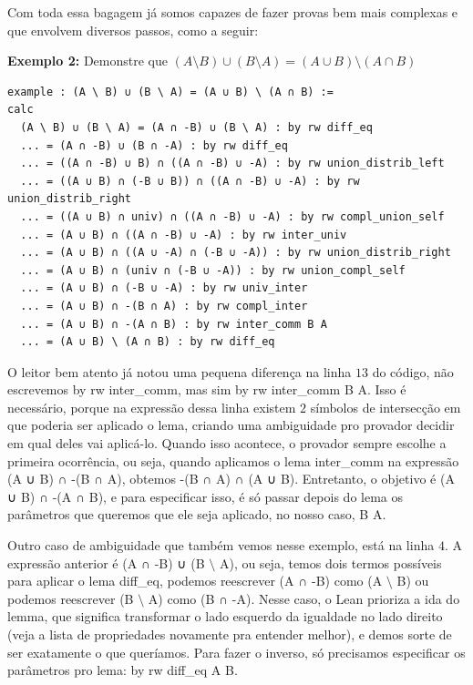 Com toda essa bagagem já somos capazes de fazer provas bem mais complexas e que envolvem diversos passos, como a seguir:

\textbf{Exemplo 2:} Demonstre que $(A \setminus B) \cup (B \setminus A) = (A \cup B) \setminus (A \cap B)$
\begin{lstlisting}
example : (A \ B) ∪ (B \ A) = (A ∪ B) \ (A ∩ B) :=
calc
  (A \ B) ∪ (B \ A) = (A ∩ -B) ∪ (B \ A) : by rw diff_eq
  ... = (A ∩ -B) ∪ (B ∩ -A) : by rw diff_eq
  ... = ((A ∩ -B) ∪ B) ∩ ((A ∩ -B) ∪ -A) : by rw union_distrib_left
  ... = ((A ∪ B) ∩ (-B ∪ B)) ∩ ((A ∩ -B) ∪ -A) : by rw union_distrib_right
  ... = ((A ∪ B) ∩ univ) ∩ ((A ∩ -B) ∪ -A) : by rw compl_union_self
  ... = (A ∪ B) ∩ ((A ∩ -B) ∪ -A) : by rw inter_univ
  ... = (A ∪ B) ∩ ((A ∪ -A) ∩ (-B ∪ -A)) : by rw union_distrib_right
  ... = (A ∪ B) ∩ (univ ∩ (-B ∪ -A)) : by rw union_compl_self
  ... = (A ∪ B) ∩ (-B ∪ -A) : by rw univ_inter
  ... = (A ∪ B) ∩ -(B ∩ A) : by rw compl_inter
  ... = (A ∪ B) ∩ -(A ∩ B) : by rw inter_comm B A
  ... = (A ∪ B) \ (A ∩ B) : by rw diff_eq \end{lstlisting}

O leitor bem atento já notou uma pequena diferença na linha $13$ do código, não escrevemos {\selectfont by rw inter\_comm}, mas sim {\selectfont by rw inter\_comm B A}. Isso é necessário, porque na expressão dessa linha existem $2$ símbolos de intersecção em que poderia ser aplicado o lema, criando uma ambiguidade pro provador decidir em qual deles vai aplicá-lo. Quando isso acontece, o provador sempre escolhe a primeira ocorrência, ou seja, quando aplicamos o lema {\selectfont inter\_comm} na expressão {\selectfont (A ∪ B) ∩ -(B ∩ A)}, obtemos {\selectfont -(B ∩ A) ∩ (A ∪ B)}. Entretanto, o objetivo é {\selectfont (A ∪ B) ∩ -(A ∩ B)}, e para especificar isso, é só passar depois do lema os parâmetros que queremos que ele seja aplicado, no nosso caso, {\selectfont B A}.

Outro caso de ambiguidade que também vemos nesse exemplo, está na linha $4$. A expressão anterior é {\selectfont (A ∩ -B) ∪ (B $\setminus$ A)}, ou seja, temos dois termos possíveis para aplicar o lema {\selectfont diff\_eq}, podemos reescrever {\selectfont (A ∩ -B)} como {\selectfont (A $\setminus$ B)} ou podemos reescrever  {\selectfont (B $\setminus$ A)} como {\selectfont (B ∩ -A)}. Nesse caso, o Lean prioriza a ida do lemma, que significa transformar o lado esquerdo da igualdade no lado direito (veja a lista de propriedades novamente pra entender melhor), e demos sorte de ser exatamente o que queríamos. Para fazer o inverso, só precisamos especificar os parâmetros pro lema: {\selectfont by rw diff\_eq A B}.

